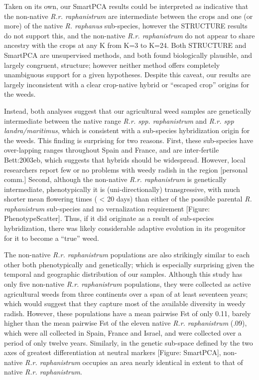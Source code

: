 \documentclass[twocolumn]{bmcart}%
\begin{document}
Taken on its own, our SmartPCA results could be interpreted as indicative that the non-native \textit{R.r. raphanistrum} are intermediate between the crops and one (or more) of the native \textit{R. raphanus} sub-species, however the STRUCTURE results do not support this, and the non-native \textit{R.r. raphanistrum} do not appear to share ancestry with the crops at any K from K=3 to K=24. Both STRUCTURE and SmartPCA are unsupervised methods, and both found biologically plausible, and largely congruent, structure; however neither method offers completely unambiguous support for a given hypotheses. Despite this caveat, our results are largely inconsistent with a clear crop-native hybrid or “escaped crop” origins for the weeds.

Instead, both analyses suggest that our agricultural weed samples are genetically intermediate between the native range \textit{R.r. spp. raphanistrum} and \textit{R.r. spp landra/maritimus}, which is consistent with a sub-species hybridization origin for the weeds. This finding is surprising for two reasons. First, these sub-species have over-lapping ranges throughout Spain and France, and are inter-fertile {Bett:2003eb}, which suggests that hybrids should be widespread. However, local researchers report few or no problems with weedy radish in the region [personal comm.] Second, although the non-native \textit{R.r. raphanistrum} is genetically intermediate, phenotypically it is (uni-directionally) transgressive, with much shorter mean flowering times ( < 20 days) than either of the possible parental \textit{R. raphanistrum} sub-species and no vernalization requirement [Figure: PhenotypeScatter]. Thus, if it did originate as a result of sub-species hybridization, there was likely considerable adaptive evolution in its progenitor for it to become a “true” weed.

The non-native \textit{R.r. raphanistrum} populations are also strikingly similar to each other both phenotypically and genetically; which is especially surprising given the temporal and geographic distribution of our samples. Although this study has only five non-native \textit{R.r. raphanistrum} populations, they were collected as active agricultural weeds from three continents over a span of at least seventeen years; which would suggest that they capture most of the available diversity in weedy radish. However, these populations have a mean pairwise Fst of only 0.11, barely higher than the mean pairwise Fst of the eleven native \textit{R.r. raphanistrum} (.09), which were all collected in Spain, France and Israel, and were collected over a period of only twelve years. Similarly, in the genetic sub-space defined by the two axes of greatest differentiation at neutral markers [Figure: SmartPCA], non-native \textit{R.r. raphanistrum} occupies an area nearly identical in extent to that of native \textit{R.r. raphanistrum}. 
\end{document}
